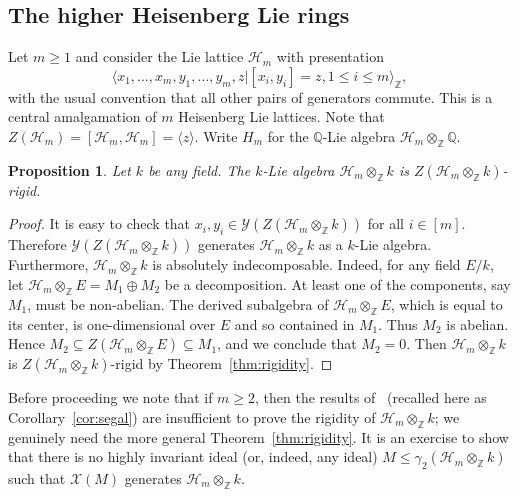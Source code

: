 \documentclass[11pt,a4paper]{amsart}
\theoremstyle{plain}
\newtheorem{pro}[thm]{Proposition}
\theoremstyle{remark}
\newcommand{\Z}{\mathbb{Z}}
\newcommand{\Q}{\mathbb{Q}}
\newcommand{\tensor}{\otimes}
\begin{document}
\subsection{The higher Heisenberg Lie rings} \label{sec:higher.heisenberg}
Let $m \geq 1$ and consider the Lie lattice $\mathcal{H}_m$ with presentation
\begin{equation*}
\langle x_1, \dots, x_m, y_1, \dots, y_m, z | [x_i, y_i] = z, 1 \leq i \leq m \rangle_{\Z},
\end{equation*}
with the usual convention that all other pairs of generators commute.
This is a central amalgamation of $m$ Heisenberg Lie lattices.  Note that $Z(\mathcal{H}_m) = [\mathcal{H}_m, \mathcal{H}_m] = \langle z \rangle$.  Write $H_m$ for the $\Q$-Lie algebra $\mathcal{H}_m \tensor_\Z \Q$.

\begin{pro} \label{pro:hh.rigid}
Let $k$ be any field.  The $k$-Lie algebra $\mathcal{H}_m \tensor_\Z k$ is $Z(\mathcal{H}_m \tensor_\Z k)$-rigid.
\end{pro}
\begin{proof}
It is easy to check that $x_i, y_i \in \mathcal{Y}(Z(\mathcal{H}_m \tensor_\Z k))$ for all $i \in [m]$.  Therefore $\mathcal{Y}(Z(\mathcal{H}_m \tensor_\Z k))$ generates $\mathcal{H}_m \tensor_\Z k$ as a $k$-Lie algebra.
Furthermore, $\mathcal{H}_m \tensor_\Z k$ is absolutely indecomposable.  Indeed, for any field $E/k$, let $\mathcal{H}_m \tensor_\Z E = M_1 \oplus M_2$ be a decomposition.  At least one of the components, say $M_1$, must be non-abelian.  The derived subalgebra of $\mathcal{H}_m \tensor_\Z E$, which is equal to its center, is one-dimensional over $E$ and so contained in $M_1$.  Thus $M_2$ is abelian.  Hence $M_2 \subseteq Z(\mathcal{H}_m \tensor_\Z E) \subseteq M_1$, and we conclude that $M_2 = 0$.  Then $\mathcal{H}_m \tensor_\Z k$ is $Z(\mathcal{H}_m \tensor_\Z k)$-rigid by Theorem~\ref{thm:rigidity}.
\end{proof}

Before proceeding we note that if $m \geq 2$, then the results of~\cite{Segal/89} (recalled here as Corollary~\ref{cor:segal}) are insufficient to prove the rigidity of $\mathcal{H}_m \tensor_\Z k$; we genuinely need the more general Theorem~\ref{thm:rigidity}.  It is an exercise to show that there is no highly invariant ideal (or, indeed, any ideal) $M \leq \gamma_2 (\mathcal{H}_m \tensor_\Z k)$ such that $\mathcal{X}(M)$ generates $\mathcal{H}_m \tensor_\Z k$. 
\end{document}
